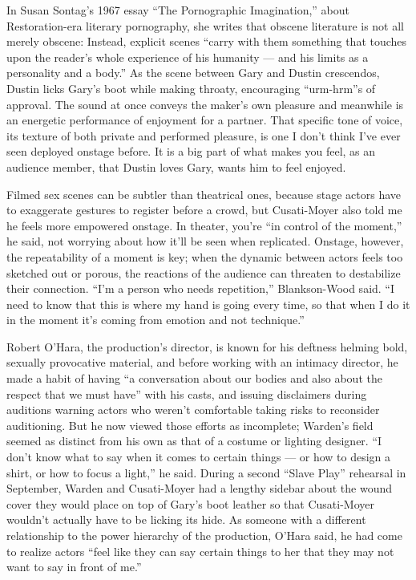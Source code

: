 In Susan Sontag's 1967 essay ``The Pornographic Imagination,'' about
Restoration-era literary pornography, she writes that obscene literature
is not all merely obscene: Instead, explicit scenes ``carry with them
something that touches upon the reader's whole experience of his
humanity --- and his limits as a personality and a body.'' As the scene
between Gary and Dustin crescendos, Dustin licks Gary's boot while
making throaty, encouraging ``urm-hrm''s of approval. The sound at once
conveys the maker's own pleasure and meanwhile is an energetic
performance of enjoyment for a partner. That specific tone of voice, its
texture of both private and performed pleasure, is one I don't think
I've ever seen deployed onstage before. It is a big part of what makes
you feel, as an audience member, that Dustin loves Gary, wants him to
feel enjoyed.

Filmed sex scenes can be subtler than theatrical ones, because stage
actors have to exaggerate gestures to register before a crowd, but
Cusati-Moyer also told me he feels more empowered onstage. In theater,
you're ``in control of the moment,'' he said, not worrying about how
it'll be seen when replicated. Onstage, however, the repeatability of a
moment is key; when the dynamic between actors feels too sketched out or
porous, the reactions of the audience can threaten to destabilize their
connection. ``I'm a person who needs repetition,'' Blankson-Wood said.
``I need to know that this is where my hand is going every time, so that
when I do it in the moment it's coming from emotion and not technique.''

Robert O'Hara, the production's director, is known for his deftness
helming bold, sexually provocative material, and before working with an
intimacy director, he made a habit of having ``a conversation about our
bodies and also about the respect that we must have'' with his casts,
and issuing disclaimers during auditions warning actors who weren't
comfortable taking risks to reconsider auditioning. But he now viewed
those efforts as incomplete; Warden's field seemed as distinct from his
own as that of a costume or lighting designer. ``I don't know what to
say when it comes to certain things --- or how to design a shirt, or how
to focus a light,'' he said. During a second ``Slave Play'' rehearsal in
September, Warden and Cusati-Moyer had a lengthy sidebar about the wound
cover they would place on top of Gary's boot leather so that
Cusati-Moyer wouldn't actually have to be licking its hide. As someone
with a different relationship to the power hierarchy of the production,
O'Hara said, he had come to realize actors ``feel like they can say
certain things to her that they may not want to say in front of me.''


